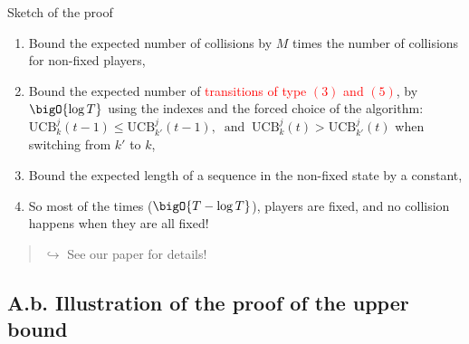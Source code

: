 \documentclass[12pt,english,ignorenonframetext,]{beamer}
\begin{document}
\begin{frame}{Sketch of the proof}

\begin{enumerate}
\def\labelenumi{\arabic{enumi}.}
\item
  Bound the expected number of collisions by \(M\) times the number of
  collisions for non-fixed players,\pause
\item
  Bound the expected number of
  \textcolor<2>{red}{transitions of type $(3)$ and $(5)$}, by
  \(\bigO{\log T}\) using the \klUCB{} indexes and the forced choice of
  the algorithm:
  \(\mathrm{UCB}_k^j(t-1) \leq \mathrm{UCB}^j_{k'}(t-1), \;\;\text{and}\;\; \mathrm{UCB}_k^j(t) > \mathrm{UCB}^j_{k'}(t)\)
  when switching from \(k'\) to \(k\),\pause
\item
  Bound the expected length of a sequence in the non-fixed state by a
  constant,\pause
\item
  So most of the times (\(\bigO{T - \log T}\)), players are fixed, and
  no collision happens when they are all fixed!
\end{enumerate}

\begin{quote}
\strut

\hfill\(\hookrightarrow\) See our paper for details!
\end{quote}

\end{frame}

\subsection{\hfill{}A.b. Illustration of the proof of the upper bound\hfill{}}
\end{document}

